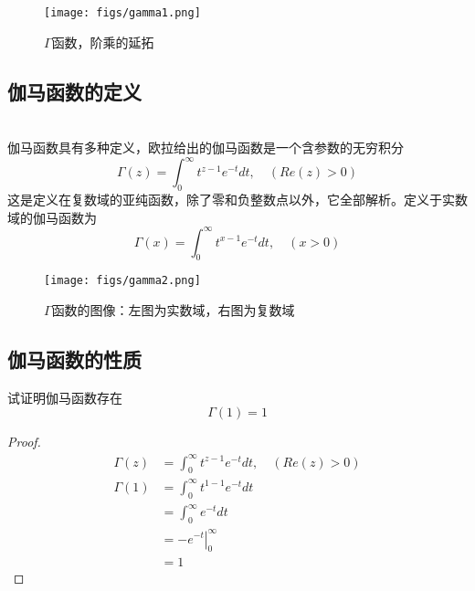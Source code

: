 	\begin{figure}[htbp]
		\centering
		\texttt{[image: figs/gamma1.png]}
		\caption{$\Gamma$函数，阶乘的延拓}
	\end{figure}
	
	\subsection{伽马函数的定义}~\\
	伽马函数具有多种定义，欧拉给出的伽马函数是一个含参数的无穷积分
	\begin{equation}
		\Gamma(z)=\int_{0}^{\infty} t^{z-1} e^{-t} dt , \quad (Re(z) > 0)
	\end{equation}
	这是定义在复数域的亚纯函数，除了零和负整数点以外，它全部解析。定义于实数域的伽马函数为
	\begin{equation*}
		\Gamma(x)=\int_{0}^{\infty} t^{x-1} e^{-t} dt, \quad (x>0)
	\end{equation*}	
	\begin{figure}[h]
		\centering
		\texttt{[image: figs/gamma2.png]}
		\caption{$\Gamma$函数的图像：左图为实数域，右图为复数域}
	\end{figure}
	
	\subsection{伽马函数的性质}
	
	\begin{example} 试证明伽马函数存在
		\begin{equation}
		\boxed{\Gamma(1)=1} 
	\end{equation}	
	\end{example}
	\begin{proof}
		\[ \begin{aligned}
				\Gamma(z)&=\int_{0}^{\infty} t^{z-1} e^{-t} dt , \quad (Re(z) > 0) \\
			\Gamma(1)&=\int_{0}^{\infty} t^{1-1} e^{-t} dt \\	
					&=\int_{0}^{\infty}  e^{-t} dt \\
					&= \left.-e^{-t}\right\vert_{0}^{\infty} \\
					&=1	
		\end{aligned}\]
	\end{proof}
	~~\\ 
	
